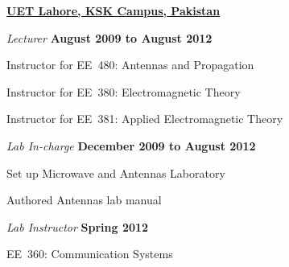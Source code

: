 \documentclass[10pt]{article}
\begin{document}
\href{http://www.uet.edu.pk/}{\textbf{UET Lahore, KSK Campus, Pakistan}}
\begin{outerlist}

\item[] \textit{Lecturer}%
    \hfill \textbf{August 2009 to August 2012}
    \begin{innerlist}
        \item[] Instructor for EE~480: Antennas and Propagation
        \item[] Instructor for EE~380: Electromagnetic Theory
        \item[] Instructor for EE~381: Applied Electromagnetic Theory
    \end{innerlist}

\item[] \textit{Lab In-charge}
    \hfill \textbf{December 2009 to August 2012}
    \begin{innerlist}
        \item[] Set up Microwave and Antennas Laboratory
        \item[] Authored Antennas lab manual
        \end{innerlist}

\item[] \textit{Lab Instructor}
\hfill \textbf{Spring 2012}
    \begin{innerlist}
        \item[] EE~360: Communication Systems
    \end{innerlist}
\end{outerlist}

\end{document}
